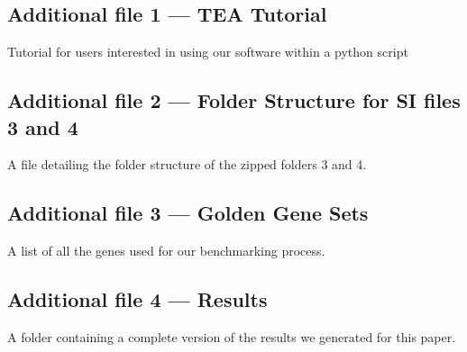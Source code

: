 \documentclass{bmcart}
\begin{document}
\begin{backmatter}
  \subsection*{Additional file 1 --- TEA Tutorial}
    Tutorial for users interested in using our software within a python script
  \subsection*{Additional file 2 --- Folder Structure for SI files 3 and 4}
    A file detailing the folder structure of the zipped folders 3 and 4. 
  \subsection*{Additional file 3 --- Golden Gene Sets}
    A list of all the genes used for our benchmarking process. 
  \subsection*{Additional file 4 --- Results}
    A folder containing a complete version of the results we generated for this paper. 






\end{backmatter}
\end{document}
